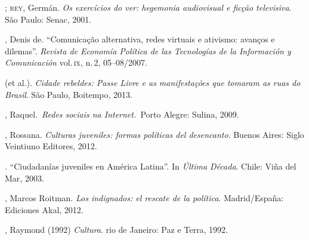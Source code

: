 \begin{bibliohedra}
\titidem; \textsc{rey}, Germán. \textit{Os exercícios do ver:
hegemonia audiovisual e ficção televisiva}. São Paulo: Senac, 2001.

, Denis de. ``Comunicação alternativa, redes virtuais e ativismo:
avanços e dilemas''. \textit{Revista de Economía Política de las
Tecnologías de la Información y Comunicación} vol.\,\textsc{ix},
n.\,2, 05--08/2007.

 (et al.). \textit{Cidade rebeldes: Passe Livre e as
manifestações que tomaram as ruas do Brasil}. São Paulo, Boitempo, 2013.

, Raquel.~\textit{Redes sociais na Internet.~}Porto Alegre: Sulina,
2009.

, Rossana. \textit{Culturas juveniles: formas políticas del
desencanto}. Buenos Aires: Siglo Veintiuno Editores, 2012.

\titidem. ``Ciudadanías juveniles en América
Latina''. In \textit{Última Década}. Chile: Viña del Mar, 2003.

, Marcos Roitman. \textit{Los indignados: el rescate de la
política}. Madrid/España: Ediciones Akal, 2012.

, Raymond (1992) \textit{Cultura}. rio de Janeiro: Paz e Terra,
1992.
\end{bibliohedra}



\begin{flushright}
\end{flushright}

